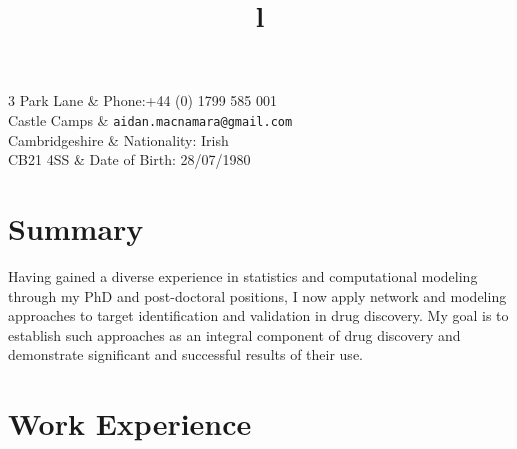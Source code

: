 \documentclass[overlapped, line, 11pt, letterpaper]{res}
\begin{document}

\setlength{\leftmargini}{1em}
\renewcommand{\labelitemi}{$\bullet$}


\renewcommand{\namefont}{\large\textbf}


\begin{resume}

\begin{ncolumn}{2}
  3 Park Lane		& Phone:+44 (0) 1799 585 001\\
  Castle Camps	& {\small \tt aidan.macnamara@gmail.com} \\
  Cambridgeshire		& Nationality: Irish \\
  CB21 4SS	& Date of Birth: 28/07/1980
\end{ncolumn}


\section{\bf Summary}

Having gained a diverse experience in statistics and computational modeling through my PhD and post-doctoral positions, I now apply network and modeling approaches to target identification and validation in drug discovery. My goal is to establish such approaches as an integral component of drug discovery and demonstrate significant and successful results of their use. 


\section{\bf Work Experience}
\begin{formatb}
\title{l} \\
\\
\body \\
\end{formatb}


\end{resume}
\end{document}
